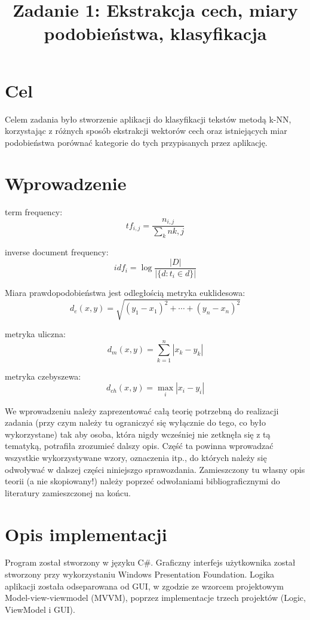 \documentclass{classrep}
\author{
	\studentinfo{Justyna Hubert}{210200} \and
	\studentinfo{Karol Podlewski}{210294}
}
\title{Zadanie 1: Ekstrakcja cech, miary podobieństwa, klasyfikacja}
\begin{document}
	\maketitle
	
	
	\section{Cel}
	Celem zadania było stworzenie aplikacji do klasyfikacji tekstów metodą k-NN, korzystając z różnych sposób ekstrakcji wektorów cech oraz istniejących miar podobieństwa porównać kategorie do tych przypisanych przez aplikację.
	
	\section{Wprowadzenie}

	
	term frequency:
	$$
	tf_{i,j}
	= \frac{n_{i,j}}{\sum_{k}n{k,j}}
	$$
	
	inverse document frequency:
	$$
	idf_{i}
	= \log\frac{|D|}{|\{d : t_{i} \in d\}|}
	$$

	Miara prawdopodobieństwa jest odległością 
	metryka euklidesowa:
	$$
	d_{e}(x,y)= \sqrt{ (y_{1} - x_{1})^2 + \cdots + (y_{n} - x_{n})^2 }
	$$
	
	metryka uliczna:
	$$
	d_{m}(x,y)= \sum_{k=1}^{n} | x_{k} - y_{k} |
	$$
	
	metryka czebyszewa:
	$$
	d_{ch}(x,y)= \max_{i} |x_{i} - y_{i}|
	$$

	{\color{blue}
	We wprowadzeniu należy zaprezentować całą teorię potrzebną do realizacji
	zadania (przy czym należy tu ograniczyć się wyłącznie do tego, co było
	wykorzystane) tak aby osoba, która nigdy wcześniej nie zetknęła się z tą
	tematyką, potrafiła zrozumieć dalszy opis. Część ta powinna wprowadzać
	wszystkie wykorzystywane wzory, oznaczenia itp., do których należy się
	odwoływać w dalszej części niniejszgo sprawozdania. Zamieszczony tu własny
	opis teorii (a nie skopiowany!) należy poprzeć odwołaniami bibliograficznymi
	do literatury zamieszczonej na końcu. }

	\section{Opis implementacji}
	Program został stworzony w języku C\#. Graficzny interfejs użytkownika został stworzony przy  wykorzystaniu Windows Presentation Foundation. Logika aplikacji została odseparowana od GUI, w zgodzie ze wzorcem projektowym Model-view-viewmodel (MVVM), poprzez implementacje trzech projektów (Logic, ViewModel i GUI).
	
\end{document}

